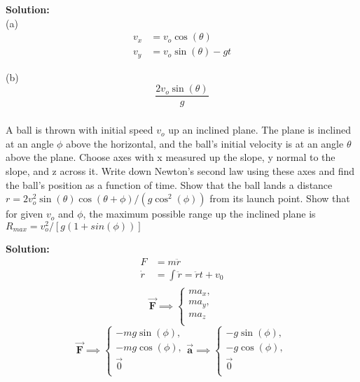 \documentclass{article}
\newcommand\Problem{%
    \subsubsection{}%
}
\newcommand\TheSolution{%
  \textbf{Solution:}\\%
}
\begin{document}
\TheSolution
(a)
\begin{equation}
    \begin{aligned}
        v_x & = v_o \cos(\theta)      \\
        v_y & = v_o \sin(\theta) - gt
    \end{aligned}
\end{equation}

(b)
\[ \boxed{\frac{2v_o \sin(\theta)}{g}} \]

\Problem
A ball is thrown with initial speed $v_o$ up an inclined plane. The plane is inclined at an angle $\phi$ above the horizontal, and the ball's initial velocity is at an angle $\theta$ above the plane. Choose axes with x measured up the slope, y normal to the slope, and z across it. Write down Newton's second law using these axes and find the ball's position as a function of time. Show that the ball lands a distance $r = 2v_o^2 \sin(\theta)\cos(\theta + \phi) / (g \cos^2(\phi))$ from its launch point. Show that for given $v_o$ and $\phi$, the maximum possible range up the inclined plane is $R_{max} = v_o^2 / [g(1 + sin(\phi))]$

\TheSolution
\begin{equation}
    \begin{aligned}
        F       & = m \ddot{r}                        \\
        \dot{r} & =  \int \ddot{r} = \ddot{r} t + v_0 \\
    \end{aligned}
\end{equation}
\[\pmb{\vec{F}} \implies \begin{cases}
        ma_x, \\
        ma_y, \\
        ma_z  \\
    \end{cases}\]
\begin{equation}
    \pmb{\vec{F}} \implies \begin{cases}
        -mg\sin(\phi), \\
        -mg\cos(\phi), \\
        \vec{0}        \\
    \end{cases}
    \pmb{\vec{a}} \implies \begin{cases}
        -g\sin(\phi), \\
        -g\cos(\phi), \\
        \vec{0}       \\
    \end{cases}
\end{equation}
\end{document}
